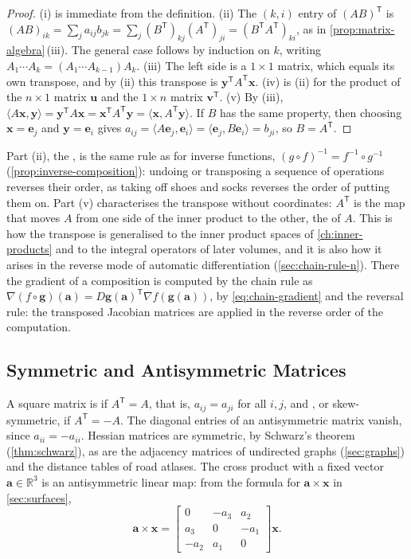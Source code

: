\begin{proof}
(i) is immediate from the definition. (ii) The $(k,i)$ entry of $(AB)^{\mathsf T}$ is $(AB)_{ik}=\sum_ja_{ij}b_{jk}=\sum_j(B^{\mathsf T})_{kj}(A^{\mathsf T})_{ji}=(B^{\mathsf T}A^{\mathsf T})_{ki}$, as in \cref{prop:matrix-algebra}\,(iii). The general case follows by induction on $k$, writing $A_1\cdots A_k=(A_1\cdots A_{k-1})A_k$. (iii) The left side is a $1\times1$ matrix, which equals its own transpose, and by (ii) this transpose is $\mathbf y^{\mathsf T}A^{\mathsf T}\mathbf x$. (iv) is (ii) for the product of the $n\times1$ matrix $\mathbf u$ and the $1\times n$ matrix $\mathbf v^{\mathsf T}$. (v) By (iii), $\langle A\mathbf x,\mathbf y\rangle=\mathbf y^{\mathsf T}A\mathbf x=\mathbf x^{\mathsf T}A^{\mathsf T}\mathbf y=\langle\mathbf x,A^{\mathsf T}\mathbf y\rangle$. If $B$ has the same property, then choosing $\mathbf x=\mathbf e_j$ and $\mathbf y=\mathbf e_i$ gives $a_{ij}=\langle A\mathbf e_j,\mathbf e_i\rangle=\langle\mathbf e_j,B\mathbf e_i\rangle=b_{ji}$, so $B=A^{\mathsf T}$.
\end{proof}

Part (ii), the , is the same rule as for inverse functions, $(g\circ f)^{-1}=f^{-1}\circ g^{-1}$ (\cref{prop:inverse-composition}): undoing or transposing a sequence of operations reverses their order, as taking off shoes and socks reverses the order of putting them on. Part (v) characterises the transpose without coordinates: $A^{\mathsf T}$ is the map that moves $A$ from one side of the inner product to the other, the  of $A$. This is how the transpose is generalised to the inner product spaces of \cref{ch:inner-products} and to the integral operators of later volumes, and it is also how it arises in the reverse mode of automatic differentiation (\cref{sec:chain-rule-n}). There the gradient of a composition is computed by the chain rule as $\nabla(f\circ\mathbf g)(\mathbf a)=D\mathbf g(\mathbf a)^{\mathsf T}\nabla f(\mathbf g(\mathbf a))$, by \eqref{eq:chain-gradient} and the reversal rule: the transposed Jacobian matrices are applied in the reverse order of the computation.

\subsection{Symmetric and Antisymmetric Matrices}

A square matrix is  if $A^{\mathsf T}=A$, that is, $a_{ij}=a_{ji}$ for all $i,j$, and , or skew-symmetric, if $A^{\mathsf T}=-A$. The diagonal entries of an antisymmetric matrix vanish, since $a_{ii}=-a_{ii}$. Hessian matrices are symmetric, by Schwarz's theorem (\cref{thm:schwarz}), as are the adjacency matrices of undirected graphs (\cref{sec:graphs}) and the distance tables of road atlases. The cross product with a fixed vector $\mathbf a\in\mathbb R^3$ is an antisymmetric linear map: from the formula for $\mathbf a\times\mathbf x$ in \cref{sec:surfaces},
\[
\mathbf a\times\mathbf x=\begin{bmatrix}0&-a_3&a_2\\a_3&0&-a_1\\-a_2&a_1&0\end{bmatrix}\mathbf x .
\]

